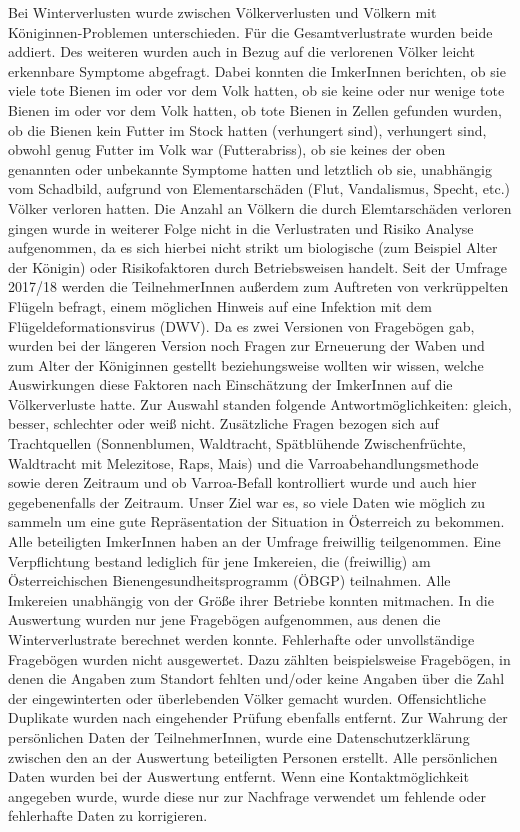 \newline
Bei Winterverlusten wurde zwischen Völkerverlusten und Völkern mit Königinnen-Problemen unterschieden. Für die Gesamtverlustrate wurden beide addiert. Des weiteren wurden auch in Bezug auf die verlorenen Völker leicht erkennbare Symptome abgefragt. Dabei konnten die ImkerInnen berichten, ob sie viele tote Bienen im oder vor dem Volk hatten, ob sie keine oder nur wenige tote Bienen im oder vor dem Volk hatten, ob tote Bienen in Zellen gefunden wurden, ob die Bienen kein Futter im Stock hatten (verhungert sind), verhungert sind, obwohl genug Futter im Volk war (Futterabriss), ob sie keines der oben genannten oder unbekannte Symptome hatten und letztlich ob sie, unabhängig vom Schadbild, aufgrund von Elementarschäden (Flut, Vandalismus, Specht, etc.) Völker verloren hatten. Die Anzahl an Völkern die durch Elemtarschäden verloren gingen wurde in weiterer Folge nicht in die Verlustraten und Risiko Analyse aufgenommen, da es sich hierbei nicht strikt um biologische (zum Beispiel Alter der Königin) oder Risikofaktoren durch Betriebsweisen handelt. Seit der Umfrage 2017/18 werden die TeilnehmerInnen außerdem zum Auftreten von verkrüppelten Flügeln befragt, einem möglichen Hinweis auf eine Infektion mit dem Flügeldeformationsvirus (DWV).
\newline
Da es zwei Versionen von Fragebögen gab, wurden bei der längeren Version noch Fragen zur Erneuerung der Waben und zum Alter der Königinnen gestellt beziehungsweise wollten wir wissen, welche Auswirkungen diese Faktoren nach Einschätzung der ImkerInnen auf die Völkerverluste hatte. Zur Auswahl standen folgende Antwortmöglichkeiten: gleich, besser, schlechter oder weiß nicht. Zusätzliche Fragen bezogen sich auf Trachtquellen (Sonnenblumen, Waldtracht, Spätblühende Zwischenfrüchte, Waldtracht mit Melezitose, Raps, Mais) und die Varroabehandlungsmethode sowie deren Zeitraum und ob Varroa-Befall kontrolliert wurde und auch hier gegebenenfalls der Zeitraum. 
\newline
Unser Ziel war es, so viele Daten wie möglich zu sammeln um eine gute Repräsentation der Situation in Österreich zu bekommen. Alle beteiligten ImkerInnen haben an der Umfrage freiwillig teilgenommen. Eine Verpflichtung bestand lediglich für jene Imkereien, die (freiwillig) am Österreichischen Bienengesundheitsprogramm (ÖBGP) teilnahmen. Alle Imkereien unabhängig von der Größe ihrer Betriebe konnten mitmachen. In die Auswertung wurden nur jene Fragebögen aufgenommen, aus denen die Winterverlustrate berechnet werden konnte. Fehlerhafte oder unvollständige Fragebögen wurden nicht ausgewertet. Dazu zählten beispielsweise Fragebögen, in denen die Angaben zum Standort fehlten und/oder keine Angaben über die Zahl der eingewinterten oder überlebenden Völker gemacht wurden.  Offensichtliche Duplikate wurden nach eingehender Prüfung ebenfalls entfernt.
\newline
Zur Wahrung der persönlichen Daten der TeilnehmerInnen, wurde eine Datenschutzerklärung zwischen den an der Auswertung beteiligten Personen erstellt. Alle persönlichen Daten wurden bei der Auswertung entfernt. Wenn eine Kontaktmöglichkeit angegeben wurde, wurde diese nur zur Nachfrage verwendet um fehlende oder fehlerhafte Daten zu korrigieren.

